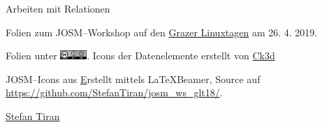 \documentclass{beamer}
\begin{document}
\begin{frame}{Arbeiten mit Relationen}
\end{frame}

\begin{frame}
Folien zum JOSM--Workshop auf den
\href{http://http://linuxtage.at/}{Grazer Linuxtagen} am 26. 4. 2019.
\vspace{1cm}

Folien unter \includegraphics[width=1cm]{cc-by-sa.png}.
Icons der Datenelemente erstellt von \href{https://wiki.openstreetmap.org/wiki/User:Ck3d}{Ck3d}
\vspace{1cm}

JOSM--Icons aus \href{https://josm.openstreetmap.de/wiki/Help}

Erstellt mittels \LaTeX Beamer, Source auf \url{https://github.com/StefanTiran/josm_ws_glt18/}.
\vspace{1cm}

\href{mailto:osm@stefantiran.at}{Stefan Tiran}
\end{frame}
\end{document}
